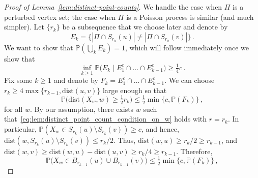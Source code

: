 \documentclass[11pt, reqno]{article}
\numberwithin{equation}{section}
\theoremstyle{definition}
\def\P{\mathbb{P}}
\newcommand{\1}{\mathds{1}}
\begin{document}
\begin{proof}[Proof of Lemma~\ref{lem:distinct-point-counts}]
    We handle the case when $\Pi$ is a perturbed vertex set; the case when $\Pi$ is a Poisson process is similar (and much simpler).    
    Let $\{r_k\}$ be a subsequence that we choose later and denote by 
    \[
    E_k = \big\{ |\Pi\cap S_{r_k}(u)| \neq |\Pi\cap S_{r_k}(v)| \big\} \, .
    \]
    We want to show that $ \P(\bigcup_{k} E_k ) = 1$, which will follow immediately once we show that 
    \begin{equation} \label{eq:proof_of_lemma_distinct_points_lower_bound_on_conditional_prob}
        \inf_{k\ge 1} \P\big( E_k \mid E_1^c\cap \ldots \cap E_{k-1}^c \big) \ge \tfrac14 c \, .
    \end{equation}
    Fix some $k\ge 1$ and denote by $F_k = E_1^c\cap \ldots \cap E_{k-1}^c$. We can choose $r_k \ge 4 \max\{ r_{k-1}, \text{dist}(u,v)\}$ large enough so that 
    \begin{equation*}
        \P \big(\text{dist}(X_w,w) \ge \tfrac12 r_k \big) \le \tfrac12 \min\{c,\P(F_k)\} \, ,
    \end{equation*}
    for all $w$. By our assumption, there exists $w$ such that~\eqref{eq:lem:distinct_point_count_condition_on_w} holds with $r=r_k$.
    In particular, $\P(X_w \in S_{r_k}(u) \setminus S_{r_k}(v)) \ge c$, and hence, $\text{dist}(w, S_{r_k}(u) \setminus S_{r_k}(v)) \le r_k/2$. Thus, $\text{dist}(w,u) \ge r_k/2 \ge r_{k-1}$, and $\text{dist}(w,v) \ge \text{dist}(w,u) - \text{dist}(u,v) \ge r_k/4 \ge r_{k-1}$.
    Therefore,
    \begin{equation} \label{eq:proof_of_lemma_distinct_point_choice_of_r_k}
        \P \big(X_w \in B_{r_{k-1}}(u) \cup B_{r_{k-1}}(v) \big) \le \tfrac12 \min\{c,\P(F_k)\} \, ,
    \end{equation}
    

\end{proof}
\end{document}
